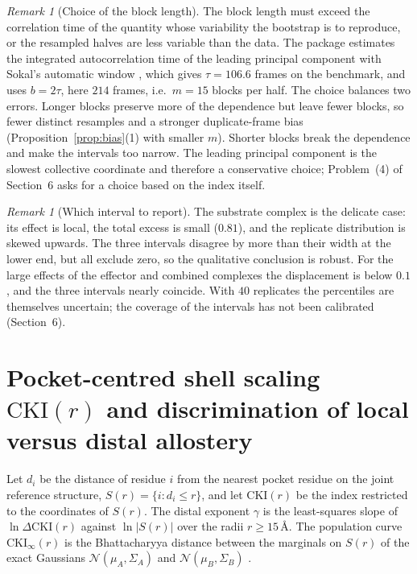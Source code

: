 \documentclass[11pt,reqno]{amsart}
\theoremstyle{plain}
\theoremstyle{definition}
\theoremstyle{remark}
\newtheorem{remark}[theorem]{Remark}
\numberwithin{equation}{section}
\newcommand{\DCKI}{\Delta\mathrm{CKI}}
\begin{document}
\begin{remark}[Choice of the block length]
The block length must exceed the correlation time of the quantity whose variability the bootstrap is to reproduce, or the resampled halves are less variable than the data. The package estimates the integrated autocorrelation time of the leading principal component with Sokal's automatic window \cite{Sokal1997}, which gives $\tau=106.6$ frames on the benchmark, and uses $b=2\tau$, here $214$ frames, i.e.\ $m=15$ blocks per half. The choice balances two errors. Longer blocks preserve more of the dependence but leave fewer blocks, so fewer distinct resamples and a stronger duplicate-frame bias (Proposition~\ref{prop:bias}(1) with smaller $m$). Shorter blocks break the dependence and make the intervals too narrow. The leading principal component is the slowest collective coordinate and therefore a conservative choice; Problem~(4) of Section~6 asks for a choice based on the index itself.
\end{remark}

\begin{remark}[Which interval to report]
The substrate complex is the delicate case: its effect is local, the total excess is small ($0.81$), and the replicate distribution is skewed upwards. The three intervals disagree by more than their width at the lower end, but all exclude zero, so the qualitative conclusion is robust. For the large effects of the effector and combined complexes the displacement is below $0.1$, and the three intervals nearly coincide. With $40$ replicates the percentiles are themselves uncertain; the coverage of the intervals has not been calibrated (Section~6).
\end{remark}

\section{Pocket-centred shell scaling \texorpdfstring{$\mathrm{CKI}(r)$}{CKI(r)} and discrimination of local versus distal allostery}
\label{sec:shell}

Let $d_i$ be the distance of residue $i$ from the nearest pocket residue on the joint reference structure, $S(r)=\{i:d_i\le r\}$, and let $\mathrm{CKI}(r)$ be the index restricted to the coordinates of $S(r)$. The distal exponent $\gamma$ is the least-squares slope of $\ln\DCKI(r)$ against $\ln|S(r)|$ over the radii $r\ge15$\,\AA. The population curve $\mathrm{CKI}_\infty(r)$ is the Bhattacharyya distance between the marginals on $S(r)$ of the exact Gaussians $\mathcal N(\mu_A,\Sigma_A)$ and $\mathcal N(\mu_B,\Sigma_B)$ \cite{Bhattacharyya1943}.
\end{document}
